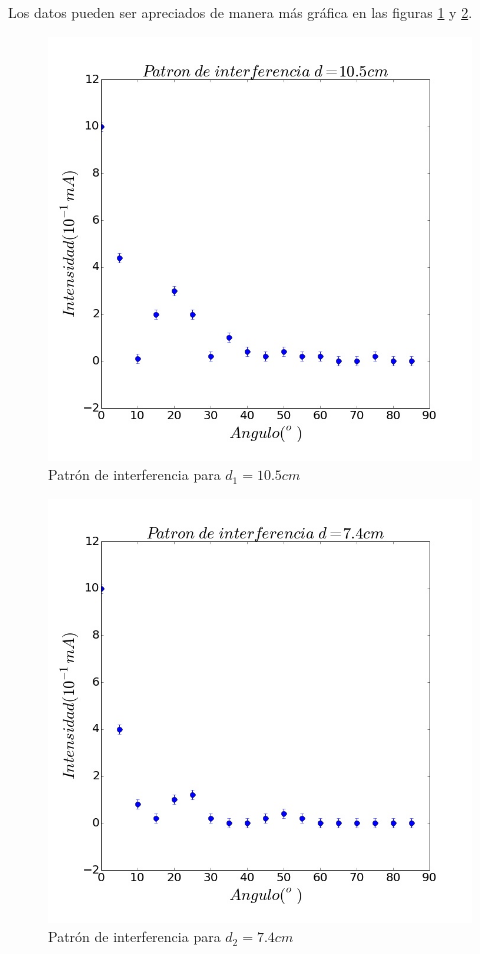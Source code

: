 \documentclass[%
 reprint,
 amsmath,amssymb,
 aps,
]{revtex4-1}
\begin{document}
Los datos pueden ser apreciados de manera más gráfica en las figuras \ref{fig:inter1} y \ref{fig:inter2}.\\

\begin{figure}[h!]
\centering
\includegraphics[width=1\linewidth]{inter1}
\caption{Patrón de interferencia para $d_1 = 10.5cm$}
\label{fig:inter1}
\end{figure}

\begin{figure}[h!]
\centering
\includegraphics[width=1\linewidth]{inter2}
\caption{Patrón de interferencia para $d_2 = 7.4cm$}
\label{fig:inter2}
\end{figure}
\end{document}
